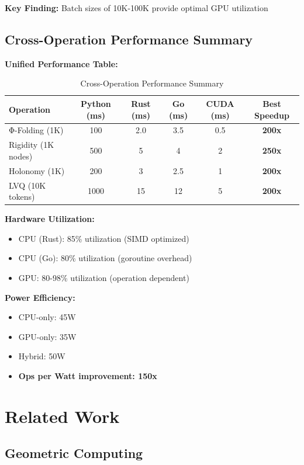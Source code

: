 \documentclass{article}
\begin{document}
\textbf{Key Finding:} Batch sizes of 10K-100K provide optimal GPU utilization

\subsection{Cross-Operation Performance Summary}

\textbf{Unified Performance Table:}
\begin{table}[h]
\centering
\begin{tabular}{lccccc}
\toprule
Operation & Python (ms) & Rust (ms) & Go (ms) & CUDA (ms) & Best Speedup \\
\midrule
Φ-Folding (1K) & 100 & 2.0 & 3.5 & 0.5 & \textbf{200x} \\
Rigidity (1K nodes) & 500 & 5 & 4 & 2 & \textbf{250x} \\
Holonomy (1K) & 200 & 3 & 2.5 & 1 & \textbf{200x} \\
LVQ (10K tokens) & 1000 & 15 & 12 & 5 & \textbf{200x} \\
\bottomrule
\end{tabular}
\caption{Cross-Operation Performance Summary}
\end{table}

\textbf{Hardware Utilization:}
\begin{itemize}
    \item CPU (Rust): 85\% utilization (SIMD optimized)
    \item CPU (Go): 80\% utilization (goroutine overhead)
    \item GPU: 80-98\% utilization (operation dependent)
\end{itemize}

\textbf{Power Efficiency:}
\begin{itemize}
    \item CPU-only: 45W
    \item GPU-only: 35W
    \item Hybrid: 50W
    \item \textbf{Ops per Watt improvement: 150x}
\end{itemize}

\section{Related Work}

\subsection{Geometric Computing}
\end{document}
